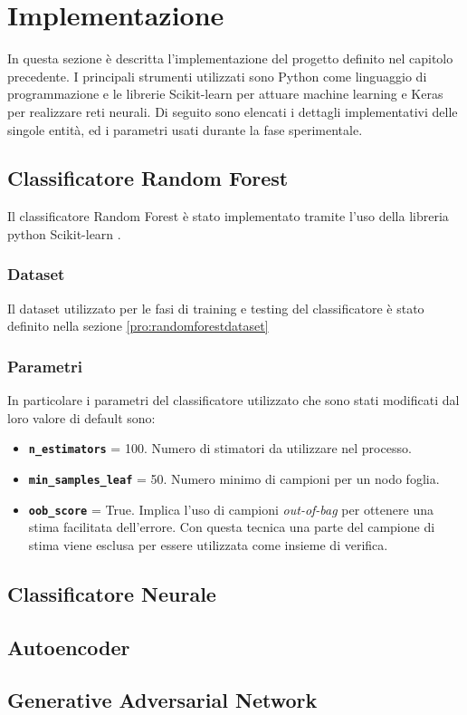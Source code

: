 \chapter{Implementazione}
\label{implementazione}
In questa sezione è descritta l'implementazione del progetto definito nel capitolo precedente. I principali strumenti utilizzati sono Python come linguaggio di programmazione e le librerie Scikit-learn \cite{sklearn} per attuare machine learning e Keras \cite{keras} per realizzare reti neurali.
Di seguito sono elencati i dettagli implementativi delle singole entità, ed i parametri usati durante la fase sperimentale.

\section{Classificatore Random Forest}
\label{imp:randomforest}
Il classificatore Random Forest è stato implementato tramite l'uso della libreria python Scikit-learn \cite{sklearn}. 

\subsection{Dataset}
Il dataset utilizzato per le fasi di training e testing del classificatore è stato definito nella sezione \ref{pro:randomforestdataset}

\subsection{Parametri}
In particolare i parametri del classificatore utilizzato che sono stati modificati dal loro valore di default sono:
\begin{itemize}
\item \textbf{\texttt{n\_estimators}} = 100. Numero di stimatori da utilizzare nel processo.
\item \textbf{\texttt{min\_samples\_leaf}} = 50. Numero minimo di campioni per un nodo foglia.
\item \textbf{\texttt{oob\_score}} = True. Implica l'uso di campioni \textit{out-of-bag} per ottenere una stima facilitata dell'errore. Con questa tecnica una parte del campione di stima viene esclusa per essere utilizzata come insieme di verifica.
\end{itemize}
\section{Classificatore Neurale}
\label{imp:classneurale}

\section{Autoencoder}
\label{imp:autoencoder}

\section{Generative Adversarial Network}
\label{imp:gan}

